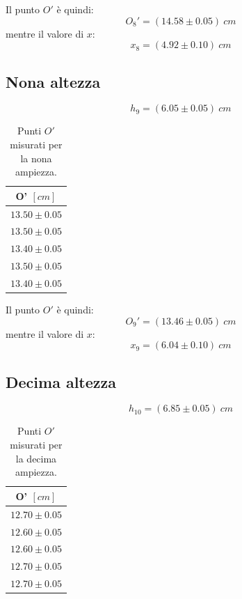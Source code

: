 Il punto $O'$ è quindi:
\begin{equation}
	O_8'=(14.58\pm0.05)\ cm
\end{equation}
mentre il valore di $x$:
\begin{equation}
	x_8=(4.92\pm 0.10)\ cm
\end{equation}

\subsection{Nona altezza}
\begin{equation}
	h_9=(6.05\pm0.05)\ cm
\end{equation}

\begin{table}[H]
	\centering
	\begin{tabular}{|c|}
		\hline
		\textbf{O' $[cm]$} \\
		\hline
		$13.50\pm 0.05$ \\
		$13.50\pm 0.05$ \\
		$13.40\pm 0.05$ \\
		$13.50\pm 0.05$ \\
		$13.40\pm 0.05$ \\
		\hline
	\end{tabular}
	\caption{Punti $O'$ misurati per la nona ampiezza.}
	\label{tab:}
\end{table}

Il punto $O'$ è quindi:
\begin{equation}
	O_9'=(13.46\pm0.05)\ cm
\end{equation}
mentre il valore di $x$:
\begin{equation}
	x_9=(6.04\pm 0.10)\ cm
\end{equation}

\subsection{Decima altezza}
\begin{equation}
	h_10=(6.85\pm0.05)\ cm
\end{equation}

\begin{table}[H]
	\centering
	\begin{tabular}{|c|}
		\hline
		\textbf{O' $[cm]$} \\
		\hline
		$12.70\pm 0.05$ \\
		$12.60\pm 0.05$ \\
		$12.60\pm 0.05$ \\
		$12.70\pm 0.05$ \\
		$12.70\pm 0.05$ \\
		\hline
	\end{tabular}
	\caption{Punti $O'$ misurati per la decima ampiezza.}
	\label{tab:}
\end{table}

